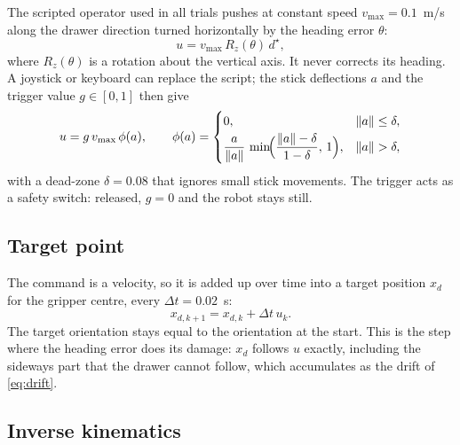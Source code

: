 \documentclass[11pt,a4paper]{article}
\newcommand{\norm}[1]{\left\lVert #1 \right\rVert}
\newcommand{\dstar}{d^{\star}}
\begin{document}
The scripted operator used in all trials pushes at constant speed $v_{\max} = 0.1$~m/s along the
drawer direction turned horizontally by the heading error $\theta$:
\begin{equation}\label{eq:script}
  u = v_{\max}\, R_z(\theta)\, \dstar ,
\end{equation}
where $R_z(\theta)$ is a rotation about the vertical axis. It never corrects its heading. A
joystick or keyboard can replace the script; the stick deflections $a$ and the trigger value $g
\in [0,1]$ then give
\begin{equation}\label{eq:joy}
  u = g\, v_{\max}\, \phi(a), \qquad
  \phi(a) = \begin{cases} 0, & \norm{a} \le \delta, \\[2pt]
    \dfrac{a}{\norm{a}}\,\min\!\Bigl(\dfrac{\norm{a} - \delta}{1 - \delta},\, 1\Bigr), & \norm{a} > \delta, \end{cases}
\end{equation}
with a dead-zone $\delta = 0.08$ that ignores small stick movements. The trigger acts as a safety
switch: released, $g = 0$ and the robot stays still.

\subsection{Target point}

The command is a velocity, so it is added up over time into a target position $x_d$ for the
gripper centre, every $\Delta t = 0.02$~s:
\begin{equation}\label{eq:setpoint}
  x_{d,k+1} = x_{d,k} + \Delta t\, u_k .
\end{equation}
The target orientation stays equal to the orientation at the start. This is the step where the
heading error does its damage: $x_d$ follows $u$ exactly, including the sideways part that the
drawer cannot follow, which accumulates as the drift of \cref{eq:drift}.

\subsection{Inverse kinematics}
\end{document}
